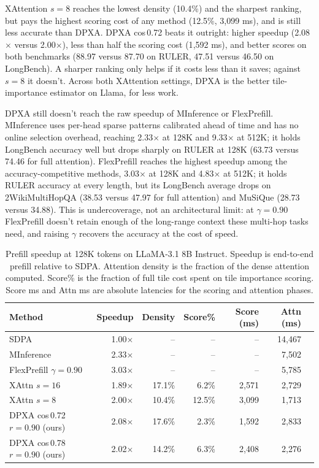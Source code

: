 XAttention $s{=}8$ reaches the lowest density (10.4\%) and the sharpest ranking, but pays the highest scoring cost of any method (12.5\%, 3{,}099 ms), and is still less accurate than DPXA. DPXA cos\,0.72 beats it outright: higher speedup (2.08$\times$ versus 2.00$\times$), less than half the scoring cost (1{,}592 ms), and better scores on both benchmarks (88.97 versus 87.70 on RULER, 47.51 versus 46.50 on LongBench). A sharper ranking only helps if it costs less than it saves; against $s{=}8$ it doesn't. Across both XAttention settings, DPXA is the better tile-importance estimator on Llama, for less work.

DPXA still doesn't reach the raw speedup of MInference or FlexPrefill. MInference uses per-head sparse patterns calibrated ahead of time and has no online selection overhead, reaching 2.33$\times$ at 128K and 9.33$\times$ at 512K; it holds LongBench accuracy well but drops sharply on RULER at 128K (63.73 versus 74.46 for full attention). FlexPrefill reaches the highest speedup among the accuracy-competitive methods, 3.03$\times$ at 128K and 4.83$\times$ at 512K; it holds RULER accuracy at every length, but its LongBench average drops on 2WikiMultiHopQA (38.53 versus 47.97 for full attention) and MuSiQue (28.73 versus 34.88). This is undercoverage, not an architectural limit: at $\gamma{=}0.90$ FlexPrefill doesn't retain enough of the long-range context these multi-hop tasks need, and raising $\gamma$ recovers the accuracy at the cost of speed.




\begin{table}[!ht]
\centering
\caption{Prefill speedup at 128K tokens on LLaMA-3.1 8B Instruct. Speedup is end-to-end prefill relative to SDPA. Attention density is the fraction of the dense attention computed. Score\% is the fraction of full tile cost spent on tile importance scoring. Score ms and Attn ms are absolute latencies for the scoring and attention phases.}
\label{tab:delta_tile_speedup}
\begin{tabular}{lrrrrrr}
\toprule
Method & Speedup & Density & Score\% & Score (ms) & Attn (ms) \\
\midrule
SDPA                        & 1.00$\times$ &    --  &    -- &    -- & 14{,}467 \\
MInference                  & 2.33$\times$ &    --  &    -- &    -- &  7{,}502 \\
FlexPrefill $\gamma=0.90$   & 3.03$\times$ &    --  &    -- &    -- &  5{,}785 \\
\midrule
XAttn $s=16$                & 1.89$\times$ & 17.1\% &  6.2\% & 2{,}571 & 2{,}729 \\
XAttn $s=8$                 & 2.00$\times$ & 10.4\% & 12.5\% & 3{,}099 & 1{,}713 \\
\midrule
DPXA cos\,0.72 $r{=}0.90$ (ours) & 2.08$\times$ & 17.6\% &  2.3\% & 1{,}592 & 2{,}833 \\
DPXA cos\,0.78 $r{=}0.90$ (ours) & 2.02$\times$ & 14.2\% &  6.3\% & 2{,}408 & 2{,}276 \\
\bottomrule
\end{tabular}
\end{table}

